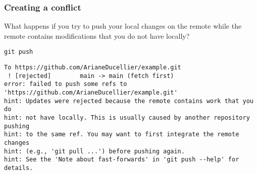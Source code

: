 \documentclass{beamer}
\begin{document}
	\begin{frame}[fragile]
		\frametitle{Creating a conflict}

		What happens if you try to push your local changes on the remote while the remote contains modifications that you do not have locally?

		\begin{exampleblock}{}
		\begin{BVerbatim}
git push
		\end{BVerbatim}
		\end{exampleblock}{}

		\begin{exampleblock}{}
		\begin{tiny}
		\begin{BVerbatim}
To https://github.com/ArianeDucellier/example.git
 ! [rejected]        main -> main (fetch first)
error: failed to push some refs to 'https://github.com/ArianeDucellier/example.git'
hint: Updates were rejected because the remote contains work that you do
hint: not have locally. This is usually caused by another repository pushing
hint: to the same ref. You may want to first integrate the remote changes
hint: (e.g., 'git pull ...') before pushing again.
hint: See the 'Note about fast-forwards' in 'git push --help' for details.
		\end{BVerbatim}
		\end{tiny}
		\end{exampleblock}{}
	\end{frame}
\end{document}
